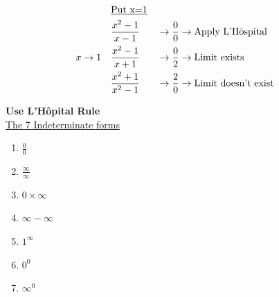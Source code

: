 \documentclass[12pt]{article}
\begin{document}
\begin{minipage}{0.6\textwidth}
    \begin{alignat*}{2}
             & \text{\underline{Put x=1}}\\
             & \frac{x^2-1}{x-1} &&\to \frac{0}{0} \to \text{Apply L'H\^ospital} \\
        x\to1 \quad & \frac{x^2-1}{x+1} &&\to \frac{0}{2} \to \text{Limit exists} \\
             & \frac{x^2+1}{x^2-1} &&\to \frac{2}{0} \to \text{Limit doesn't exist} \\
    \end{alignat*}
\end{minipage}
\begin{minipage}{0.3\textwidth}
    \textbf{Use L'H\^opital Rule}\\
    \underline{The 7 Indeterminate forms} \\
    \begin{enumerate}[(1)]
        \item $\frac{0}{0}$ 
        \item $\frac{\infty}{\infty}$ 
        \item $0 \times \infty$ 
        \item $\infty-\infty$
        \item $1^{\infty}$ 
        \item $0^0$ 
        \item $\infty^0$
    \end{enumerate}
\end{minipage}
\end{document}
